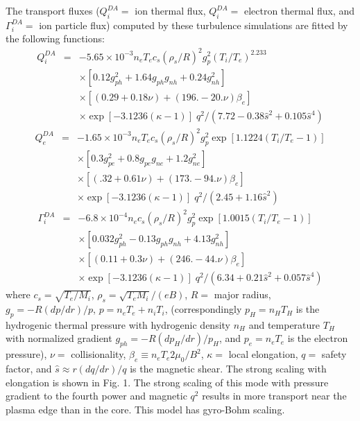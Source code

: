 The transport fluxes ($ Q_i^{DA} = $ ion thermal flux,
$ Q_i^{DA} = $ electron thermal flux, and
$ \Gamma_i^{DA} = $ ion particle flux)
computed by these turbulence
simulations are fitted by the following functions:
\begin{eqnarray*}
Q_i^{DA}
 & = & - 5.65 \times 10^{-3} n_e T_e c_s ( \rho_s / R )^2 g_p^2
      ( T_i / T_e )^{2.233} \\
 & & \times [ 0.12 g_{ph}^2 + 1.64 g_{ph} g_{nh} + 0.24 g_{nh}^2 ] \\
 & & \times
[ ( 0.29 + 0.18 \nu ) + ( 196. - 20. \nu ) \beta_e ] \\
 & & \times \exp [ -3.1236 ( \kappa - 1 ) ] 
   \; q^2 / ( 7.72 - 0.38 \hat{s}^2 + 0.105 \hat{s}^4 )
\end{eqnarray*}
\begin{eqnarray*}
Q_e^{DA}
 & = & - 1.65 \times 10^{-3} n_e T_e c_s ( \rho_s / R )^2  g_p^2
      \exp [ 1.1224 ( T_i / T_e  - 1 ) ]
  \\
 & &  \times [ 0.3 g_{pe}^2 + 0.8 g_{pe} g_{ne} + 1.2 g_{ne}^2 ] \\
 & & \times
[ ( .32 + 0.61 \nu ) + ( 173. - 94. \nu ) \beta_e ] \\
 & & \times \exp [ -3.1236 ( \kappa - 1 ) ] 
 \; q^2  / ( 2.45 + 1.16 \hat{s}^2 )
\end{eqnarray*}
\begin{eqnarray*}
\Gamma_i^{DA}
 & = & - 6.8 \times 10^{-4} n_e c_s ( \rho_s / R )^2  g_p^2
      \exp [ 1.0015 ( T_i / T_e  - 1 ) ] \\
 & &  \times [ 0.032 g_{ph}^2 - 0.13 g_{ph} g_{nh} + 4.13 g_{nh}^2 ] \\
 & & \times
  [ ( 0.11 + 0.3 \nu ) + ( 246. - 44. \nu ) \beta_e ] \\
 & & \times \exp [ -3.1236 ( \kappa - 1 ) ] 
 \; q^2 / ( 6.34 + 0.21 \hat{s}^2 + 0.057 \hat{s}^4 )
\end{eqnarray*}
where $ c_s = \sqrt{T_e/M_i} $, $ \rho_s = \sqrt{T_e M_i} / ( e B )$,
$ R = $ major radius, 
$ g_p = - R ( d p / d r ) / p $, $ p = n_e T_e + n_i T_i $,
(correspondingly $ p_H = n_H T_H $ is the hydrogenic thermal pressure with 
hydrogenic density $ n_H $ and temperature $ T_H $ with normalized gradient
$ g_{ph} = - R ( d p_H / d r ) / p_H $,
and $ p_e = n_e T_e $ is the electron pressure),
$ \nu = $ collisionality,
$ \beta_e \equiv n_e T_e 2 \mu_0 / B^2 $,
$ \kappa = $ local elongation,
$ q = $ safety factor, and
$ \hat{s} \approx r ( d q / d r ) / q $ is the magnetic shear.
The strong scaling with elongation is shown in Fig. 1.  
The strong scaling
of this mode with pressure gradient to the fourth power
and magnetic $ q^2 $ results in
more transport near the plasma edge than in the core.  
This model has gyro-Bohm scaling.


